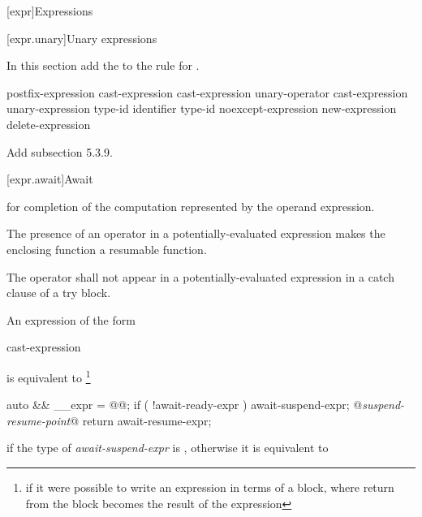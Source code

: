 

\setcounter{chapter}{4}
[expr]{Expressions}

\setcounter{section}{2}
[expr.unary]{Unary expressions}

In this section add the   
to the rule for .

\begin{bnf}
	\br
	postfix-expression\br
	\terminal{++} cast-expression\br
	\terminal{-{-}} cast-expression\br
	\br
	unary-operator cast-expression\br
	 unary-expression\br
	 type-id \terminal{)}\br
	 \terminal{(} identifier \terminal{)}\br
	 type-id \terminal{)}\br
	noexcept-expression\br
	new-expression\br
	delete-expression\br
\end{bnf}

Add subsection 5.3.9.

\setcounter{subsection}{8}
[expr.await]{Await}

\pnum
for completion of the computation represented by the operand expression.

\pnum
The presence of an  operator in a potentially-evaluated expression makes the enclosing function a resumable function.

\pnum
The  operator shall not appear in a potentially-evaluated expression in a catch clause of a try block.


\pnum
An  expression of the form

\begin{ncbnf}
	 cast-expression
\end{ncbnf}

is equivalent to \footnote{if it were possible to write
an expression in terms of a block, where return from the 
block becomes the result of the expression}

\begin{codeblock}
{
  auto && __expr = @@;
  if ( !await-ready-expr ) {
    await-suspend-expr;
    @\textit{suspend-resume-point}@
  }
  return await-resume-expr;
}
\end{codeblock}

if the type of \textit{await-suspend-expr} is , otherwise it is equivalent to

